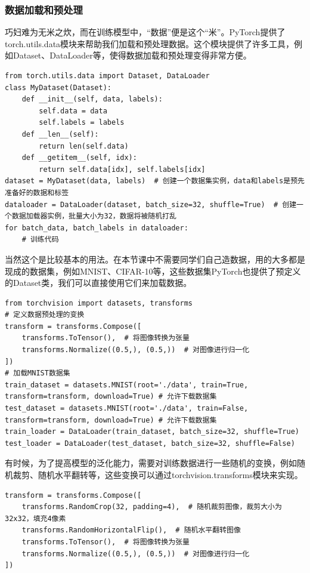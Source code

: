 \documentclass[fontset=none]{ctexart}
\begin{document}
\subsubsection{数据加载和预处理}

巧妇难为无米之炊，而在训练模型中，“数据”便是这个“米”。PyTorch提供了torch.utils.data模块来帮助我们加载和预处理数据。这个模块提供了许多工具，例如Dataset、DataLoader等，使得数据加载和预处理变得非常方便。
\begin{verbatim}
from torch.utils.data import Dataset, DataLoader
class MyDataset(Dataset):
    def __init__(self, data, labels):
        self.data = data
        self.labels = labels
    def __len__(self):
        return len(self.data)
    def __getitem__(self, idx):
        return self.data[idx], self.labels[idx]
dataset = MyDataset(data, labels)  # 创建一个数据集实例，data和labels是预先准备好的数据和标签
dataloader = DataLoader(dataset, batch_size=32, shuffle=True)  # 创建一个数据加载器实例，批量大小为32，数据将被随机打乱
for batch_data, batch_labels in dataloader:
    # 训练代码
\end{verbatim}
当然这个是比较基本的用法。在本节课中不需要同学们自己造数据，用的大多都是现成的数据集，例如MNIST、CIFAR-10等，这些数据集PyTorch也提供了预定义的Dataset类，我们可以直接使用它们来加载数据。
\begin{verbatim}
from torchvision import datasets, transforms
# 定义数据预处理的变换
transform = transforms.Compose([
    transforms.ToTensor(),  # 将图像转换为张量
    transforms.Normalize((0.5,), (0.5,))  # 对图像进行归一化
])
# 加载MNIST数据集
train_dataset = datasets.MNIST(root='./data', train=True, transform=transform, download=True) # 允许下载数据集
test_dataset = datasets.MNIST(root='./data', train=False, transform=transform, download=True) # 允许下载数据集
train_loader = DataLoader(train_dataset, batch_size=32, shuffle=True)
test_loader = DataLoader(test_dataset, batch_size=32, shuffle=False)
\end{verbatim}

有时候，为了提高模型的泛化能力，需要对训练数据进行一些随机的变换，例如随机裁剪、随机水平翻转等，这些变换可以通过torchvision.transforms模块来实现。
\begin{verbatim}
transform = transforms.Compose([
    transforms.RandomCrop(32, padding=4),  # 随机裁剪图像，裁剪大小为32x32，填充4像素
    transforms.RandomHorizontalFlip(),  # 随机水平翻转图像
    transforms.ToTensor(),  # 将图像转换为张量
    transforms.Normalize((0.5,), (0.5,))  # 对图像进行归一化
])
\end{verbatim}
\end{document}
